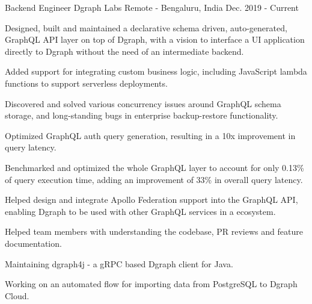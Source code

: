 

\begin{cventries}

  \cventry
    {Backend Engineer} %
    {Dgraph Labs} %
    {Remote - Bengaluru, India} %
    {Dec. 2019 - Current} %
    {
      \begin{cvitems} %
        \item {Designed, built and maintained a declarative schema driven, auto-generated, GraphQL API layer on top of Dgraph, with a vision to interface a UI application directly to Dgraph without the need of an intermediate backend.}
	\item {Added support for integrating custom business logic, including JavaScript lambda functions to support serverless deployments.}
	\item {Discovered and solved various concurrency issues around GraphQL schema storage, and long-standing bugs in enterprise backup-restore functionality.}
	\item {Optimized GraphQL auth query generation, resulting in a 10x improvement in query latency.}
	\item {Benchmarked and optimized the whole GraphQL layer to account for only 0.13\% of query execution time, adding an improvement of 33\% in overall query latency.}
	\item {Helped design and integrate Apollo Federation support into the GraphQL API, enabling Dgraph to be used with other GraphQL services in a ecosystem.}
	\item {Helped team members with understanding the codebase, PR reviews and feature documentation.}
	\item {Maintaining dgraph4j - a gRPC based Dgraph client for Java.}
	\item {Working on an automated flow for importing data from PostgreSQL to Dgraph Cloud.}
      \end{cvitems}
    }


\end{cventries}
